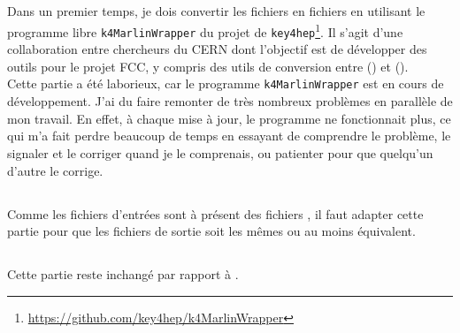\subsection{\convert}

Dans un premier temps, je dois convertir les fichiers \SLCIO en fichiers \ROOT en utilisant le programme libre \texttt{k4MarlinWrapper} du projet de \texttt{key4hep}\footnote{\url{https://github.com/key4hep/k4MarlinWrapper}}. 
Il s'agit d'une collaboration entre chercheurs du CERN dont l'objectif est de développer des outils pour le projet FCC, y compris des utils de conversion entre \LCIO (\iLCSoft) et \EDMhep (\FCC).%
\\

Cette partie a été laborieux, car le programme \texttt{k4MarlinWrapper} est en cours de développement. 
J'ai du faire remonter de très nombreux problèmes en parallèle de mon travail. 
En effet, à chaque mise à jour, le programme ne fonctionnait plus, ce qui m'a fait perdre beaucoup de temps en essayant de comprendre le problème, le signaler et le corriger quand je le comprenais, ou patienter pour que quelqu'un d'autre le corrige. 

\subsection{\processor}

Comme les fichiers d'entrées sont à présent des fichiers \ROOT, il faut adapter cette partie pour que les fichiers de sortie soit les mêmes ou au moins équivalent.

\subsection{\analysis}

Cette partie reste inchangé par rapport à \ilcsoft.